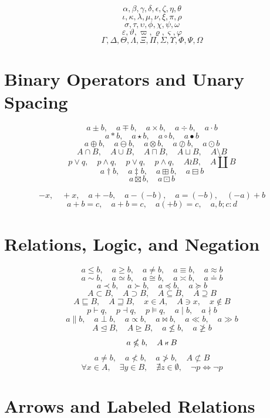 \documentclass[12pt]{article}
\begin{document}
\[
\alpha,\beta,\gamma,\delta,\epsilon,\zeta,\eta,\theta
\]
\[
\iota,\kappa,\lambda,\mu,\nu,\xi,\pi,\rho
\]
\[
\sigma,\tau,\upsilon,\phi,\chi,\psi,\omega
\]
\[
\varepsilon,\vartheta,\varpi,\varrho,\varsigma,\varphi
\]
\[
\Gamma,\Delta,\Theta,\Lambda,\Xi,\Pi,\Sigma,\Upsilon,\Phi,\Psi,\Omega
\]

\section{Binary Operators and Unary Spacing}

\[
a\pm b,\quad a\mp b,\quad a\times b,\quad a\div b,\quad a\cdot b
\]
\[
a\ast b,\quad a\star b,\quad a\circ b,\quad a\bullet b
\]
\[
a\oplus b,\quad a\ominus b,\quad a\otimes b,\quad a\oslash b,\quad a\odot b
\]
\[
A\cap B,\quad A\cup B,\quad A\sqcap B,\quad A\sqcup B,\quad A\setminus B
\]
\[
p\vee q,\quad p\wedge q,\quad p\lor q,\quad p\land q,\quad A\wr B,\quad A\amalg B
\]
\[
a\dagger b,\quad a\ddagger b,\quad a\boxplus b,\quad a\boxminus b
\]
\[
a\boxtimes b,\quad a\boxdot b
\]

\[
-x,\quad +x,\quad a+-b,\quad a-(-b),\quad a=(-b),\quad (-a)+b
\]
\[
a+b=c,\quad a{+}b=c,\quad a(+b)=c,\quad a,b;c:d
\]

\section{Relations, Logic, and Negation}

\[
a\le b,\quad a\ge b,\quad a\ne b,\quad a\equiv b,\quad a\approx b
\]
\[
a\sim b,\quad a\simeq b,\quad a\cong b,\quad a\asymp b,\quad a\doteq b
\]
\[
a\prec b,\quad a\succ b,\quad a\preceq b,\quad a\succeq b
\]
\[
A\subset B,\quad A\supset B,\quad A\subseteq B,\quad A\supseteq B
\]
\[
A\sqsubseteq B,\quad A\sqsupseteq B,\quad x\in A,\quad A\ni x,\quad x\notin B
\]
\[
p\vdash q,\quad p\dashv q,\quad p\models q,\quad a\mid b,\quad a\nmid b
\]
\[
a\parallel b,\quad a\perp b,\quad a\propto b,\quad a\bowtie b,\quad a\ll b,\quad a\gg b
\]
\[
A\trianglelefteq B,\quad A\trianglerighteq B,\quad a\nleq b,\quad a\ngeq b
\]
\[
a\nleqslant b,\quad A\nshortparallel B
\]
\[
a\not=b,\quad a\not<b,\quad a\not>b,\quad A\not\subset B
\]
\[
\forall x\in A,\quad \exists y\in B,\quad \nexists z\in\emptyset,
\quad \neg p\iff\lnot p
\]

\section{Arrows and Labeled Relations}
\end{document}
